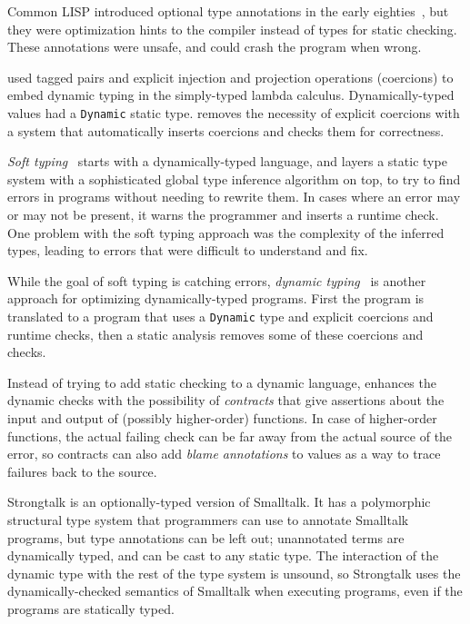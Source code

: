 \documentclass{sig-alternate}
\begin{document}
Common LISP introduced optional type annotations in the early
eighties~\citep{steele1982ocl}, but they were optimization
hints to the compiler instead of types for static checking.
These annotations were unsafe, and could crash the program
when wrong.

\citet{abadi1989dts} used tagged pairs and explicit
injection and projection operations (coercions) to embed dynamic
typing in the simply-typed lambda calculus. Dynamically-typed
values had a {\tt Dynamic} static type. \citet{thatte1990qst}
removes the necessity of explicit coercions with a system
that automatically inserts coercions and checks them for
correctness.

\textit{Soft typing}~\citep{cartwright1991soft} starts
with a dynamically-typed language, and layers a static
type system with a sophisticated global type inference
algorithm on top, to try to find errors in programs
without needing to rewrite them. In cases where an error
may or may not be present, it warns the programmer and
inserts a runtime check. One problem with the soft
typing approach was the complexity of the inferred
types, leading to errors that were difficult to understand
and fix.

While the goal of soft typing is catching errors,
\textit{dynamic typing}~\citep{henglein1994dts} is
another approach for optimizing dynamically-typed programs.
First the program is translated to a program that uses
a {\tt Dynamic} type and explicit coercions and runtime checks,
then a static analysis removes some  of these coercions and
checks.

Instead of trying to add static checking to a dynamic
language, \citet{findler2002chf} enhances
the dynamic checks with the possibility of {\em contracts}
that give assertions about the input and output of (possibly
higher-order) functions. In case of higher-order functions,
the actual failing check can be far away from the actual
source of the error, so contracts can also add {\em blame
annotations} to values as a way to trace failures back to
the source.

Strongtalk \citep{bracha1993strongtalk,bracha1996strongtalk} is
an optionally-typed version of Smalltalk. It has a
polymorphic structural type system that programmers can use
to annotate Smalltalk programs, but type annotations can be
left out; unannotated terms are dynamically typed, and can
be cast to any static type. The interaction of the dynamic
type with the rest of the type system is unsound, so
Strongtalk uses the dynamically-checked semantics of
Smalltalk when executing programs, even if the programs
are statically typed.
\end{document}
